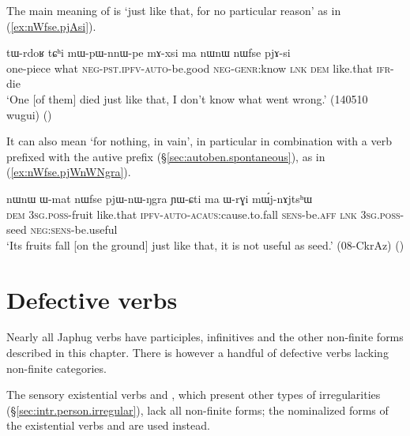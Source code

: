 The main meaning of  is `just like that, for no particular reason' as in (\ref{ex:nWfse.pjAsi}). 
\begin{exe}
\ex \label{ex:nWfse.pjAsi}
\gll  tɯ-rdoʁ tɕʰi mɯ-pɯ-nnɯ-pe mɤ-xsi ma nɯnɯ nɯfse pjɤ-si \\
one-piece what \textsc{neg}-\textsc{pst}.\textsc{ipfv}-\textsc{auto}-be.good \textsc{neg}-\textsc{genr}:know \textsc{lnk} \textsc{dem} like.that \textsc{ifr}-die \\
\glt `One [of them] died just like that, I don't know what went wrong.' (140510 wugui) ()
\end{exe}  

It can also mean `for nothing, in vain', in particular in combination with a verb prefixed with the autive prefix (§\ref{sec:autoben.spontaneous}),  as in (\ref{ex:nWfse.pjWnWNgra}).

\begin{exe}
\ex \label{ex:nWfse.pjWnWNgra}
\gll nɯnɯ ɯ-mat nɯfse pjɯ-nɯ-ŋgra ɲɯ-ɕti ma ɯ-rɣi mɯ́j-nɤjtsʰɯ \\
\textsc{dem} \textsc{3sg}.\textsc{poss}-fruit like.that \textsc{ipfv}-\textsc{auto}-\textsc{acaus}:cause.to.fall \textsc{sens}-be.\textsc{aff} \textsc{lnk} \textsc{3sg}.\textsc{poss}-seed \textsc{neg}:\textsc{sens}-be.useful \\
\glt `Its fruits fall [on the ground] just like that, it is not useful as seed.' (08-CkrAz)
()
\end{exe}  


\section{Defective verbs} \label{sec:nmlz.defective}
Nearly all Japhug verbs have participles, infinitives and the other non-finite forms described in this chapter. There is however a handful of defective verbs lacking non-finite categories. 

The sensory existential verbs  and , which present other types of irregularities (§\ref{sec:intr.person.irregular}), lack all non-finite forms; the nominalized forms of the existential verbs  and  are used instead.


